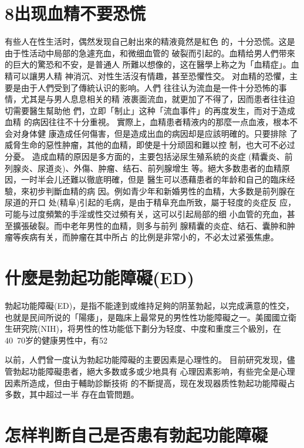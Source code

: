 \documentclass[12pt,UTF8]{ctexbook}
\begin{document}
\section{8出现血精不要恐慌}
有些人在性生活时，偶然发现自己射出來的精液竟然是紅色
的，十分恐慌。这是由于性活动中局部的急遽充血，和微细血管的
破裂而引起的。血精给男人們带來的巨大的驚恐和不安，是普通人
所難以想像的，这在醫學上称之为「血精症」。血精可以讓男人精
神消沉、对性生活沒有情趣，甚至恐懼性交。
对血精的恐懼，主要是由于人們受到了傳統认识的影响。人們
往往认为流血是一件十分恐怖的事情，尤其是与男人息息相关的精
液裹面流血，就更加了不得了，因而患者往往迫切需要醫生幫助他
們，立即「制止」这种「流血事件」的再度发生，而对于造成血精
的病因往往不十分重視。
實際上，血精患者精液内的那麼一点血液，根本不会对身体健
康造成任何傷害，但是造成出血的病因却是应該明確的。只要排除
了威脅生命的惡性肿瘤，其他的血精，即使是十分顽固和難以控
制，也大可不必过分憂。
造成血精的原因是多方面的，主要包括泌尿生殖系統的炎症
(精囊炎、前列腺炎、尿道炎)、外傷、肿瘤、结石、前列腺增生
等。絕大多数患者的血精原因，一时半会儿还難以徹底明確，但是
醫生可以憑藉患者的年龄和自己的臨床经驗，來初步判斷血精的病
因。例如青少年和新婚男性的血精，大多数是前列腺在尿道的开口
处(精阜)引起的毛病，是由于精阜充血所致，屬于轻度的炎症反
应，可能与过度頻繁的手淫或性交过頻有关，这可以引起局部的细
小血管的充血，甚至擴張破裂。而中老年男性的血精，则多与前列
腺精囊的炎症、结石、囊肿和肿瘤等疾病有关，而肿瘤在其中所占
的比例是非常小的，不必太过紧張焦慮。

\section{什麼是勃起功能障礙(ED)}

勃起功能障礙(ED)，是指不能達到或维持足夠的阴茎勃起，以完成满意的性交，也就是民间所说的「陽痿」，是臨床上最常見的男性性功能障礙之一。美國國立衛生研究院(NIH)，将男性的性功能低下劃分为轻度、中度和重度三个級別，在40~70岁的健康男性中，有52%

以前，人們曾一度认为勃起功能障礙的主要因素是心理性的。
目前研究发现，儘管勃起功能障礙患者，絕大多数或多或少地具有
心理因素影响，有些完全是心理因素所造成，但由于輔助診斷技術
的不斷提高，现在发现器质性勃起功能障礙占多数，其中超过一半
存在血管問題。

\section{怎样判断自己是否患有勃起功能障礙}
\end{document}
